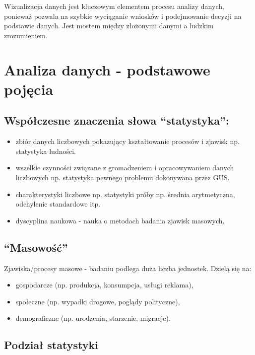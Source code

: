 \documentclass[
  letterpaper,
  DIV=11,
  numbers=noendperiod]{scrreprt}
\providecommand{\tightlist}{%
  \setlength{\itemsep}{0pt}\setlength{\parskip}{0pt}}\usepackage{longtable,booktabs,array}
\begin{document}
Wizualizacja danych jest kluczowym elementem procesu analizy danych,
ponieważ pozwala na szybkie wyciąganie wniosków i podejmowanie decyzji
na podstawie danych. Jest mostem między złożonymi danymi a ludzkim
zrozumieniem.

\section{Analiza danych - podstawowe
pojęcia}\label{analiza-danych---podstawowe-pojux119cia}

\subsection{Współczesne znaczenia słowa
``statystyka'':}\label{wspuxf3ux142czesne-znaczenia-sux142owa-statystyka}

\begin{itemize}
\tightlist
\item
  zbiór danych liczbowych pokazujący kształtowanie procesów i zjawisk
  np. statystyka ludności.
\item
  wszelkie czynności związane z gromadzeniem i opracowywaniem danych
  liczbowych np. statystyka pewnego problemu dokonywana przez GUS.
\item
  charakterystyki liczbowe np. statystyki próby np. średnia
  arytmetyczna, odchylenie standardowe itp.
\item
  dyscyplina naukowa - nauka o metodach badania zjawisk masowych.
\end{itemize}

\subsection{``Masowość''}\label{masowoux15bux107}

Zjawiska/procesy masowe - badaniu podlega duża liczba jednostek. Dzielą
się na:

\begin{itemize}
\tightlist
\item
  gospodarcze (np. produkcja, konsumpcja, usługi reklama),
\item
  społeczne (np. wypadki drogowe, poglądy polityczne),
\item
  demograficzne (np. urodzenia, starzenie, migracje).
\end{itemize}

\subsection{Podział statystyki}\label{podziaux142-statystyki}
\end{document}
